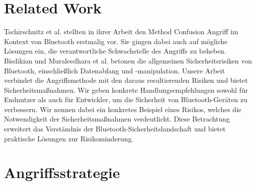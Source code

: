 \documentclass[
    a4paper,
    pagesize,
    pdftex,
    12pt,
]{scrartcl}
\begin{document}
        
    \section{Related Work}
    Tschirschnitz et al. \cite{method_confusion_attack} stellten in ihrer Arbeit den Method Confusion Angriff im Kontext von Bluetooth erstmalig vor. Sie gingen dabei auch auf mögliche Lösungen ein, die verantwortliche Schwachstelle des Angriffs zu beheben.
    Bisdikian und Muraleedhara et al. \cite{bluetooth_newest_security_risks} betonen die allgemeinen Sicherheitsrisiken von Bluetooth, einschließlich Datenabfang und -manipulation.
    Unsere Arbeit verbindet die Angriffsmethode mit den daraus resultierenden Risiken und bietet Sicherheitsmaßnahmen. Wir geben konkrete Handlungsempfehlungen sowohl für Endnutzer als auch für Entwickler, um die Sicherheit von Bluetooth-Geräten zu verbessern. Wir nennen dabei ein konkretes Beispiel eines Risikos, welches die Notwendigkeit der Sicherheitsmaßnahmen verdeutlicht.
    Diese Betrachtung erweitert das Verständnis der Bluetooth-Sicherheitslandschaft und bietet praktische Lösungen zur Risikominderung.

    \newpage



    \section{Angriffsstrategie}
\end{document}
